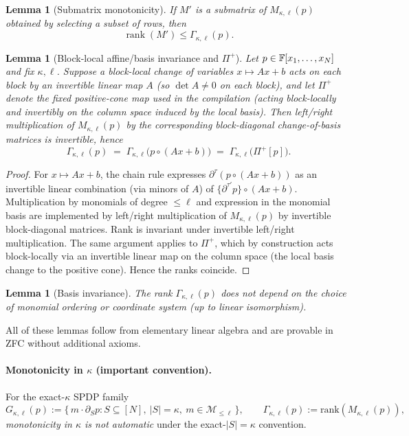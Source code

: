\documentclass[12pt]{article}
\newtheorem{lemma}[theorem]{Lemma}
\theoremstyle{definition}
\theoremstyle{definition}
\theoremstyle{remark}
\theoremstyle{remark}
\begin{document}
\begin{lemma}[Submatrix monotonicity]\label{lem:submatrix-monotonicity}
If $M'$ is a submatrix of $M_{\kappa,\ell}(p)$ obtained by selecting a subset of rows, then
\[
\operatorname{rank}(M') \leq \Gamma_{\kappa,\ell}(p).
\]
\end{lemma}

\begin{lemma}[Block-local affine/basis invariance and $\Pi^+$]
\label{lem:basis-Piplus-invariance}\label{lem:affine-map-invariance}
Let $p \in \Bbb F[x_1,\ldots,x_N]$ and fix $\kappa,\ell$.
Suppose a block-local change of variables $x \mapsto Ax+b$ acts on each block by an
invertible linear map $A$ (so $\det A \neq 0$ on each block), and let $\Pi^+$ denote the
fixed positive-cone map used in the compilation (acting block-locally and invertibly on the
column space induced by the local basis).
Then left/right multiplication of $M_{\kappa,\ell}(p)$ by the corresponding
block-diagonal change-of-basis matrices is invertible, hence
\[
\Gamma_{\kappa,\ell}(p) \;=\; \Gamma_{\kappa,\ell}\!\big(p\circ(Ax+b)\big) \;=\; \Gamma_{\kappa,\ell}\!\big(\Pi^+[p]\big).
\]
\end{lemma}

\begin{proof}
For $x\mapsto Ax+b$, the chain rule expresses $\partial^\tau(p\circ(Ax+b))$ as an
invertible linear combination (via minors of $A$) of $\{\partial^{\tau'}p\}\circ(Ax+b)$.
Multiplication by monomials of degree $\le \ell$ and expression in the monomial basis are
implemented by left/right multiplication of $M_{\kappa,\ell}(p)$ by invertible block-diagonal matrices.
Rank is invariant under invertible left/right multiplication. The same argument applies to
$\Pi^+$, which by construction acts block-locally via an invertible linear map on the column
space (the local basis change to the positive cone). Hence the ranks coincide.
\end{proof}

\begin{lemma}[Basis invariance]\label{lem:basis-invariance-appg}
The rank $\Gamma_{\kappa,\ell}(p)$ does not depend on the choice of monomial ordering or coordinate system (up to linear isomorphism).
\end{lemma}

All of these lemmas follow from elementary linear algebra and are provable in ZFC without additional axioms.

\paragraph{Monotonicity in $\kappa$ (important convention).}
For the exact-$\kappa$ SPDP family
\[
G_{\kappa,\ell}(p) := \{\, m\cdot \partial_S p : S\subseteq[N],\ |S|=\kappa,\ m\in\mathcal{M}_{\le \ell}\,\},
\qquad \Gamma_{\kappa,\ell}(p):=\mathrm{rank}(M_{\kappa,\ell}(p)),
\]
\emph{monotonicity in $\kappa$ is not automatic} under the exact-$|S|=\kappa$ convention.
\end{document}
